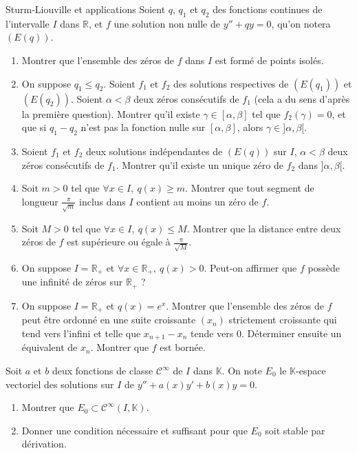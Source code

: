 \documentclass[french,a4paper]{article}
\newcommand{\R}{\mathbb{R}}
\newcommand{\K}{\mathbb{K}}
\theoremstyle{plain}
\theoremstyle{definition}
\theoremstyle{remark}
\begin{document}
\begin{ex}[Châteaux]{Sturm-Liouville et applications}
	Soient $q$, $q_1$ et $q_2$ des fonctions continues de l'intervalle $I$ dans $\R$, et $f$ une solution non nulle de $y''+qy=0$, qu'on notera $(E(q))$.
	\begin{enumerate}
		\item Montrer que l'ensemble des zéros de $f$ dans $I$ est formé de points isolés.
		\item On suppose $q_1\leqslant q_2$. Soient $f_1$ et $f_2$ des solutions respectives de $(E(q_1))$ et $(E(q_2))$. Soient $\alpha<\beta$ deux zéros consécutifs de $f_1$ (cela a du sens d'après la première question). Montrer qu'il existe $\gamma\in[\alpha,\beta]$ tel que $f_2(\gamma)=0$, et que si $q_1-q_2$ n'est pas la fonction nulle sur $[\alpha,\beta]$, alors $\gamma\in]\alpha,\beta[$.
		\item Soient $f_1$ et $f_2$ deux solutions indépendantes de $(E(q))$ sur $I$, $\alpha<\beta$ deux zéros consécutifs de $f_1$. Montrer qu'il existe un unique zéro de $f_2$ dans $]\alpha,\beta[$.
		\item Soit $m>0$ tel que $\forall x\in I,\ q(x)\geqslant m$. Montrer que tout segment de longueur $\displaystyle\frac{\pi}{\sqrt{m}}$ inclus dans $I$ contient au moins un zéro de $f$.
		\item Soit $M>0$ tel que $\forall x\in I,\ q(x)\leqslant M$. Montrer que la distance entre deux zéros de $f$ est supérieure ou égale à $\displaystyle\frac{\pi}{\sqrt{M}}$.
		\item On suppose $I=\R_+$ et $\forall x\in\R_+,\ q(x)>0$. Peut-on affirmer que $f$ possède une infinité de zéros sur $\R_+$ ?
		\item On suppose $I=\R_+$ et $q(x)=e^x$. Montrer que l'ensemble des zéros de $f$ peut être ordonné en une suite croissante $(x_n)$ strictement croissante qui tend vers l'infini et telle que $x_{n+1}-x_n$ tende vers $0$. Déterminer ensuite un équivalent de $x_n$. Montrer que $f$ est bornée.
	\end{enumerate}
\end{ex}

\begin{ex}[Moulin.44]{}
	Soit $a$ et $b$ deux fonctions de classe $\mathcal{C}^\infty$ de $I$ dans $\K$. On note $E_0$ le $\K$-espace vectoriel des solutions sur $I$ de $y''+a(x)y'+b(x)y=0$.
	\begin{enumerate}
		\item Montrer que $E_0\subset\mathcal{C}^\infty(I,\K)$.
		\item Donner une condition nécessaire et suffisant pour que $E_0$ soit stable par dérivation.
	\end{enumerate}
\end{ex}
\end{document}
